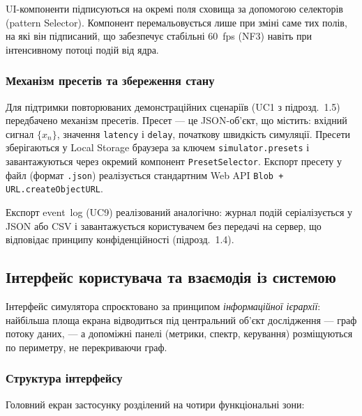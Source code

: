 UI-компоненти підписуються на окремі поля сховища за допомогою
селекторів (pattern Selector). Компонент перемальовується лише
при зміні саме тих полів, на які він підписаний, що забезпечує
стабільні 60~fps (NF3) навіть при інтенсивному потоці подій від
ядра.

\subsubsection*{Механізм пресетів та збереження стану}

Для підтримки повторюваних демонстраційних сценаріїв (UC1 з
підрозд.~1.5) передбачено механізм пресетів. Пресет --- це JSON-об'єкт,
що містить: вхідний сигнал $\{x_n\}$, значення \texttt{latency} і
\texttt{delay}, початкову швидкість симуляції. Пресети зберігаються
у Local Storage браузера за ключем \texttt{simulator.presets} і
завантажуються через окремий компонент \texttt{PresetSelector}.
Експорт пресету у файл (формат \texttt{.json}) реалізується
стандартним Web API \texttt{Blob + URL.createObjectURL}.

Експорт event~log (UC9) реалізований аналогічно: журнал подій
серіалізується у JSON або CSV і завантажується користувачем без
передачі на сервер, що відповідає принципу конфіденційності
(підрозд.~1.4).


\subsection{Інтерфейс користувача та взаємодія із системою}

Інтерфейс симулятора спроєктовано за принципом \emph{інформаційної
ієрархії}: найбільша площа екрана відводиться під центральний
об'єкт дослідження --- граф потоку даних, --- а допоміжні панелі
(метрики, спектр, керування) розміщуються по периметру, не
перекриваючи граф.

\subsubsection*{Структура інтерфейсу}

Головний екран застосунку розділений на чотири функціональні зони:

